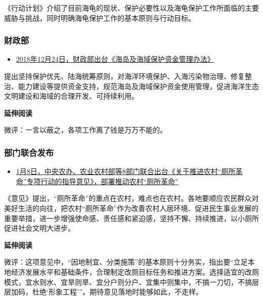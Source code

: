 \documentclass[]{book}
\providecommand{\tightlist}{%
  \setlength{\itemsep}{0pt}\setlength{\parskip}{0pt}}
\begin{document}
《行动计划》介绍了目前海龟的现状、保护必要性以及海龟保护工作所面临的主要威胁与挑战，同时明确海龟保护工作的基本原则与行动目标。

\hypertarget{ux8d22ux653fux90e8}{%
\subsubsection*{财政部}\label{ux8d22ux653fux90e8}}

\begin{itemize}
\tightlist
\item
  \href{http://jjs.mof.gov.cn/zhengwuxinxi/zhengcefagui/201901/t20190125_3132863.html}{2018年12月24日，财政部出台《海岛及海域保护资金管理办法》}
\end{itemize}

提出坚持保护优先、陆海统筹原则，对海洋环境保护、入海污染物治理、修复整治、能力建设等提供资金支持，规范海岛及海域保护资金使用管理，促进海洋生态文明建设和海域的合理开发、可持续利用。

\textbf{延伸阅读}

微评：一言以蔽之，各项工作离了钱是万万不能的。

\hypertarget{ux90e8ux95e8ux8054ux5408ux53d1ux5e03-2}{%
\subsubsection*{部门联合发布}\label{ux90e8ux95e8ux8054ux5408ux53d1ux5e03-2}}

\begin{itemize}
\tightlist
\item
  \href{http://www.jxwst.gov.cn/doc/2019/01/08/122304.shtml}{1月8日，中央农办、农业农村部等8部门联合出台《关于推进农村``厕所革命''专项行动的指导意见》，部署推动农村``厕所革命''}
\end{itemize}

《意见》提出，``厕所革命''的重点在农村，难点也在农村。各地要顺应农民群众对美好生活的向往，把农村``厕所革命''作为改善农村人居环境、促进民生事业发展的重要举措，进一步增强使命感、责任感和紧迫感，坚持不懈、持续推进，以小厕所促进社会文明大进步。

\textbf{延伸阅读}

微评：这项意见中，``因地制宜、分类施策''的基本原则十分务实，指出要``立足本地经济发展水平和基础条件，合理制定改厕目标任务和推进方案。选择适宜的改厕模式，宜水则水、宜旱则旱、宜分户则分户、宜集中则集中，不搞一刀切，不搞层层加码，杜绝`形象工程'''。期待意见落地时能够如此，不走样。
\end{document}
